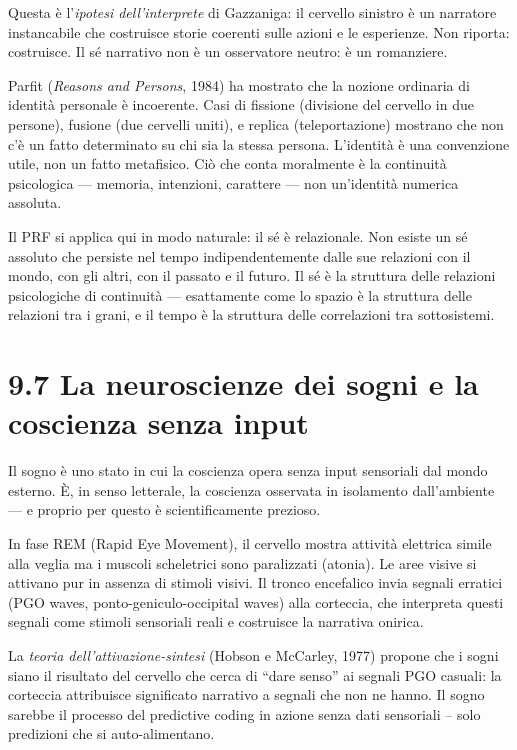 \documentclass[11.5pt,a4paper,openany]{book}
\theoremstyle{remark}
\begin{document}
Questa è l'\textit{ipotesi dell'interprete} di Gazzaniga: il cervello sinistro è un narratore instancabile che costruisce storie coerenti sulle azioni e le esperienze. Non riporta: costruisce. Il sé narrativo non è un osservatore neutro: è un romanziere.

Parfit (\textit{Reasons and Persons}, 1984) ha mostrato che la nozione ordinaria di identità personale è incoerente. Casi di fissione (divisione del cervello in due persone), fusione (due cervelli uniti), e replica (teleportazione) mostrano che non c'è un fatto determinato su chi sia la stessa persona. L'identità è una convenzione utile, non un fatto metafisico. Ciò che conta moralmente è la continuità psicologica --- memoria, intenzioni, carattere --- non un'identità numerica assoluta.

Il PRF si applica qui in modo naturale: il sé è relazionale. Non esiste un sé assoluto che persiste nel tempo indipendentemente dalle sue relazioni con il mondo, con gli altri, con il passato e il futuro. Il sé è la struttura delle relazioni psicologiche di continuità --- esattamente come lo spazio è la struttura delle relazioni tra i grani, e il tempo è la struttura delle correlazioni tra sottosistemi.

\section{9.7 La neuroscienze dei sogni e la coscienza senza input}

Il sogno è uno stato in cui la coscienza opera senza input sensoriali dal mondo esterno. È, in senso letterale, la coscienza osservata in isolamento dall'ambiente --- e proprio per questo è scientificamente prezioso.

In fase REM (Rapid Eye Movement), il cervello mostra attività elettrica simile alla veglia ma i muscoli scheletrici sono paralizzati (atonia). Le aree visive si attivano pur in assenza di stimoli visivi. Il tronco encefalico invia segnali erratici (PGO waves, ponto-geniculo-occipital waves) alla corteccia, che interpreta questi segnali come stimoli sensoriali reali e costruisce la narrativa onirica.

La \textit{teoria dell'attivazione-sintesi} (Hobson e McCarley, 1977) propone che i sogni siano il risultato del cervello che cerca di ``dare senso'' ai segnali PGO casuali: la corteccia attribuisce significato narrativo a segnali che non ne hanno. Il sogno sarebbe il processo del predictive coding in azione senza dati sensoriali -- solo predizioni che si auto-alimentano.
\end{document}
